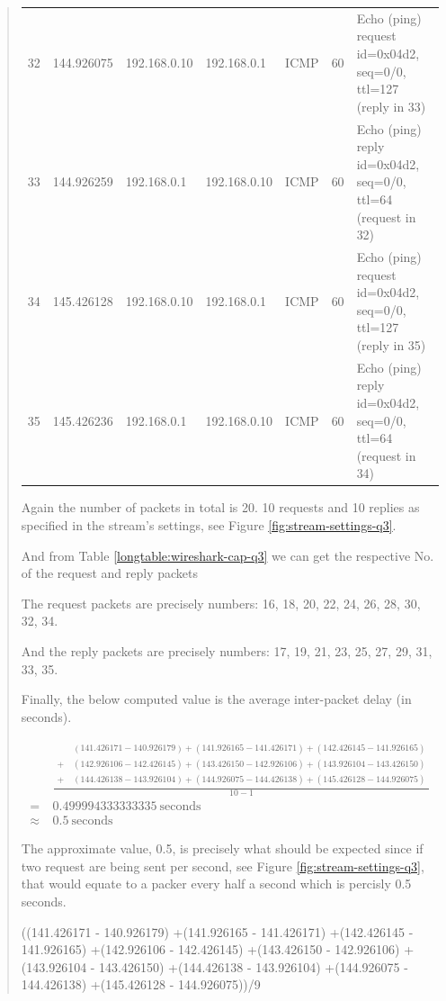 \documentclass{article}
\newenvironment{ans}
   {\fbox{Answer}\begin{quote}}
   {\end{quote}}
\begin{document}
\begin{ans}
\begin{center}
\begin{longtable}{|l|l|l|l|l|l|p{10em}|}
32 & 144.926075 & 192.168.0.10 & 192.168.0.1 & ICMP & 60 & Echo (ping)
request id=0x04d2, seq=0/0, ttl=127 (reply in 33) \\
33 & 144.926259 & 192.168.0.1 & 192.168.0.10 & ICMP & 60 & Echo (ping)
reply id=0x04d2, seq=0/0, ttl=64 (request in 32) \\
34 & 145.426128 & 192.168.0.10 & 192.168.0.1 & ICMP & 60 & Echo (ping)
request id=0x04d2, seq=0/0, ttl=127 (reply in 35) \\
35 & 145.426236 & 192.168.0.1 & 192.168.0.10 & ICMP & 60 & Echo (ping)
reply id=0x04d2, seq=0/0, ttl=64 (request in 34) \\
\end{longtable}
\end{center}

Again the number of packets in total is 20. 10 requests and 10
replies as specified in the stream's settings, see Figure
\ref{fig:stream-settings-q3}.

And from Table \ref{longtable:wireshark-cap-q3} we can get the
respective No. of the request and reply packets

The request packets are precisely numbers: 16, 18, 20, 22, 24,
26, 28, 30, 32, 34.

And the reply packets are precisely numbers: 17, 19, 21, 23, 25,
27, 29, 31, 33, 35.

Finally, the below computed value is the average inter-packet
delay (in seconds).

$$
\begin{aligned}
&\frac{
\begin{aligned}
&(141.426171 - 140.926179)
+(141.926165 - 141.426171)
+(142.426145 - 141.926165)\\
+\ &(142.926106 - 142.426145)
+(143.426150 - 142.926106)
+(143.926104 - 143.426150)\\
+\ &(144.426138 - 143.926104)
+(144.926075 - 144.426138)
+(145.426128 - 144.926075)
\end{aligned}
}{10 - 1}\\
=\ & 0.499994333333335\ \text{seconds}\\
\approx\ & 0.5\ \text{seconds}
\end{aligned}
$$

The approximate value, 0.5, is precisely what should be expected
since if two request are being sent per second, see Figure
\ref{fig:stream-settings-q3}, that would equate to a packer
every half a second which is percisly 0.5 seconds.

\begin{gruvboxlisting}[language=Python,caption={Python
   expression for calculating the inter-packet delay for
Question 3.}]
((141.426171 - 140.926179)
+(141.926165 - 141.426171)
+(142.426145 - 141.926165)
+(142.926106 - 142.426145)
+(143.426150 - 142.926106)
+(143.926104 - 143.426150)
+(144.426138 - 143.926104)
+(144.926075 - 144.426138)
+(145.426128 - 144.926075))/9
\end{gruvboxlisting}
\end{ans}
\end{document}
